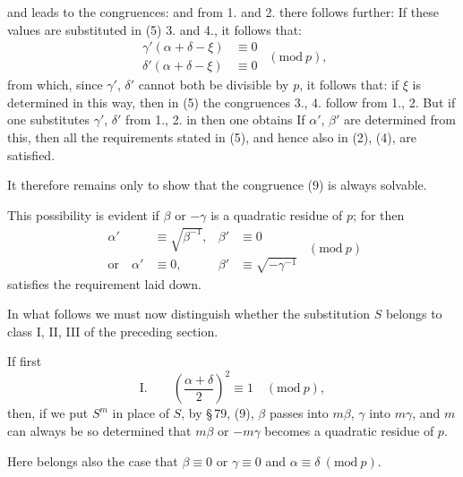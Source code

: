 and leads to the congruences:
and from 1. and 2. there follows further:
If these values are substituted in (5) 3. and 4., it follows that:
\[
\begin{aligned}
\gamma'(\alpha+\delta-\xi) &\equiv 0\\
\delta'(\alpha+\delta-\xi) &\equiv 0
\end{aligned}\ \ (\mathrm{mod}\ p),
\]
from which, since $\gamma'$, $\delta'$ cannot both be divisible by $p$, it follows that:
if $\xi$ is determined in this way, then in (5) the congruences 3., 4. follow
from 1., 2. But if one substitutes $\gamma'$, $\delta'$ from 1., 2. in
then one obtains
If $\alpha'$, $\beta'$ are determined from this, then all the requirements stated
in (5), and hence also in (2), (4), are satisfied.

It therefore remains only to show that the congruence (9) is always
solvable.

This possibility is evident if $\beta$ or $-\gamma$ is a quadratic
residue of $p$; for then
\[
\begin{aligned}
\alpha' &\equiv \sqrt{\beta^{-1}}, & \beta' &\equiv 0\\
\text{or}\quad \alpha' &\equiv 0, & \beta' &\equiv \sqrt{-\gamma^{-1}}
\end{aligned}\ \ (\mathrm{mod}\ p)
\]
satisfies the requirement laid down.

In what follows we must now distinguish whether the substitution $S$
belongs to class I, II, III of the preceding section.

If first
\[
\text{I.} \qquad \left(\frac{\alpha+\delta}{2}\right)^2 \equiv 1 \quad (\mathrm{mod}\ p),
\]
then, if we put $S^m$ in place of $S$, by \S\,79, (9),
$\beta$ passes into $m\beta$, $\gamma$ into $m\gamma$, and $m$ can always be so determined
that $m\beta$ or $-m\gamma$ becomes a quadratic residue of $p$.

Here belongs also the case that $\beta \equiv 0$ or $\gamma \equiv 0$ and
$\alpha \equiv \delta \ (\mathrm{mod}\ p)$.
